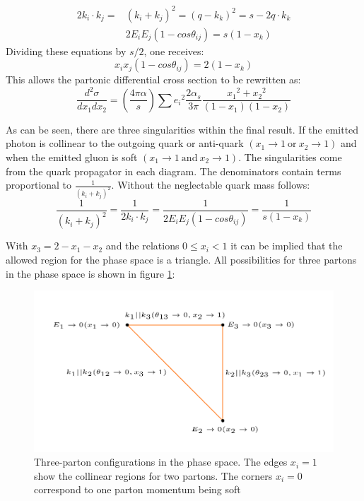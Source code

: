 \begin{equation}
\begin{split}
2k_i \cdot k_j =& (k_i+k_j)^2 = (q-k_k)^2 = s-2q \cdot k_k\\
&2E_i E_j (1-cos \theta_{ij})=s(1-x_k)
\end{split}
\end{equation}
Dividing these equations by $ s/2 $, one receives:
\begin{equation}
x_i x_j (1-cos \theta_{ij})=2(1-x_k)
\end{equation}
This allows the partonic differential cross section to be rewritten as:
\begin{equation}
\frac{d^2 \sigma}{dx_1 dx_2}= (\frac{4\pi \alpha}{s})\sum {e_i}^2 
\frac{2\alpha_s}{3\pi} \frac{{x_1}^2+{x_2}^2}{(1-x_1)(1-x_2)}
\label{fully}
\end{equation}

As can be seen, there are three singularities within the final result. 
If the emitted photon is collinear to the outgoing quark or anti-quark $ (x_1 \rightarrow 1 \:\text{or}\: x_2 \rightarrow 1) $ and when the emitted gluon is soft $ (x_1 \rightarrow 1\: \text{and}\: x_2 \rightarrow 1 )$.
\newpage
The singularities come from the quark propagator in each diagram. The denominators contain terms proportional to $ \frac{1}{(k_i + k_j)^2}  $. Without the neglectable quark mass follows:
\begin{equation}
\frac{1}{(k_i + k_j)^2}=\frac{1}{2k_i \cdot k_j}=\frac{1}{2E_iE_j(1-cos\theta_{ij})}=\frac{1}{s(1- x_k)}
\end{equation} 


With $ x_3= 2-x_1-x_2 $ and the relations $ 0\leq x_i < 1 $ it can be implied that the allowed region for the phase space is a triangle. All possibilities for three partons in the phase space is shown in figure \ref{conf}:

\begin{figure}[h!]
\centering
\includegraphics[scale=0.6]{images/Intro/triangle.png}
\caption{Three-parton configurations in the phase space.
The edges $ x_i= 1 $ show the collinear regions for two partons. The corners $ x_i= 0 $ correspond to one parton momentum being soft}
\label{conf}
\end{figure}

